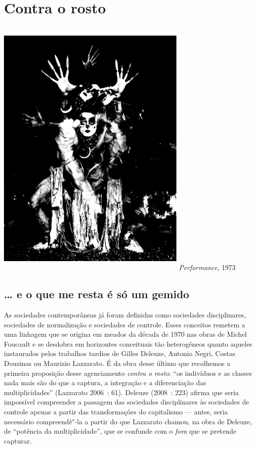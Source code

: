 \chapter{Contra o rosto}

\begin{center}
\includegraphics[width=9.245cm,height=13.019cm]{Imgs/img5.jpg}
\emph{Performance}, 1973
\end{center}

\section{\ldots{} e o que me resta é só um gemido}

As sociedades contemporâneas já foram definidas como sociedades
disciplinares, sociedades de normalização e sociedades de controle.
Esses conceitos remetem a uma linhagem que se origina em meados da
década de 1970 nas obras de Michel Foucault e se desdobra em horizontes
conceituais tão heterogêneos quanto aqueles instaurados pelos trabalhos
tardios de Gilles Deleuze, Antonio Negri, Costas Douzinas ou Maurizio
Lazzarato. É da obra desse último que recolhemos a primeira proposição
desse agenciamento \emph{contra o rosto}: ``os indivíduos e as classes
nada mais são do que a captura, a integração e a diferenciação das
multiplicidades'' (Lazzarato 2006~: 61). Deleuze (2008~: 223) afirma que
seria impossível compreender a passagem das sociedades disciplinares às
sociedades de controle apenas a partir das transformações do capitalismo
--- antes, seria necessário compreendê"-la a partir do que Lazzarato
chamou, na obra de Deleuze, de ``potência da multiplicidade'', que se
confunde com o \emph{fora} que se pretende capturar.

